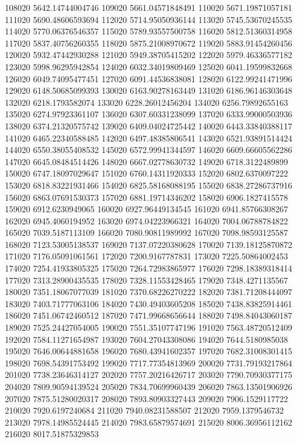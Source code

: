 {108020 5642.14744004746
109020 5661.04571848491
110020 5671.19871057181
111020 5690.48606593694
112020 5714.95050936144
113020 5745.53670245535
114020 5770.06376546357
115020 5789.93557500758
116020 5812.51360314958
117020 5837.40756260355
118020 5875.21008970672
119020 5883.91454260456
120020 5932.47442930288
121020 5949.38705415202
122020 5979.46336577182
123020 5998.96295942854
124020 6032.34019809469
125020 6041.19599832668
126020 6049.74095477451
127020 6091.44536838081
128020 6122.99241471996
129020 6148.50685099393
130020 6163.90278163449
131020 6186.96146303648
132020 6218.1793582074
133020 6228.26012456204
134020 6256.79892655163
135020 6274.97923361107
136020 6307.60331238099
137020 6333.99000503936
138020 6374.21320575742
139020 6409.04024725442
140020 6443.33840388117
141020 6465.22340588485
142020 6497.48385806541
143020 6521.93891514424
144020 6550.38055408532
145020 6572.99941344597
146020 6609.66605562286
147020 6645.08484514426
148020 6667.02778630732
149020 6718.3122489899
150020 6747.18097029647
151020 6760.14311920333
152020 6802.6370097222
153020 6818.83221931466
154020 6825.58168088195
155020 6838.27286737916
156020 6863.07691530373
157020 6881.19714346202
158020 6906.1827415578
159020 6912.6230949065
160020 6927.96449134545
161020 6941.85766308267
162020 6945.4060194952
163020 6974.04223966321
164020 7004.06788784822
165020 7039.5187113109
166020 7080.90811989992
167020 7098.98593125587
168020 7123.53005138537
169020 7137.07220380628
170020 7139.18125870872
171020 7176.05091061561
172020 7200.9167787831
173020 7225.50864002453
174020 7254.41933805325
175020 7264.72983865977
176020 7298.18389318414
177020 7313.28900435535
178020 7328.11553428465
179020 7348.4271135567
180020 7351.18067077039
181020 7370.68226270222
182020 7381.71208444097
183020 7403.71777063106
184020 7430.49403605208
185020 7438.83825914461
186020 7451.06742460512
187020 7471.99668656644
188020 7498.84043060187
189020 7525.24427054005
190020 7551.35107747196
191020 7563.48720512409
192020 7584.11271654987
193020 7604.27043308086
194020 7644.5180985038
195020 7646.00644881658
196020 7680.43941602357
197020 7682.31008301415
198020 7698.54391753492
199020 7717.77354813969
200020 7731.79193217864
201020 7738.23646314127
202020 7757.20216426717
203020 7790.70930377175
204020 7809.90594139524
205020 7834.70699960439
206020 7863.13501906926
207020 7875.51280020317
208020 7893.80903327443
209020 7906.1529117722
210020 7920.6197240684
211020 7940.08231588507
212020 7959.1379546732
213020 7978.14985524445
214020 7983.65879574691
215020 8006.36956112162
216020 8017.51875329853
}
